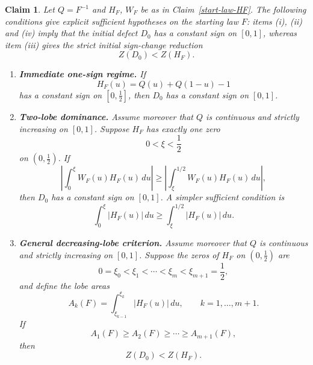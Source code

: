 \documentclass[onecolumn]{article}
\newtheorem{claim}[theorem]{Claim}
\begin{document}
\begin{claim}
\label{sufficient-conditions-summary} Let $Q=F^{-1}$ and $H_{F}$, $W_{F}$ be
as in \textit{Claim~\ref{start-law-HF}}. The following conditions give
explicit sufficient hypotheses on the starting law $F$: items \textup{(i)}, 
\textup{(ii)} and \textup{(iv)} imply that the initial defect $D_{0}$ has a
constant sign on $[0,1]$, whereas item \textup{(iii)} gives the strict
initial sign-change reduction 
\begin{equation}
Z(D_{0})<Z(H_{F}).  \label{1378.1}
\end{equation}

\begin{enumerate}
\item \textbf{Immediate one-sign regime.} If 
\begin{equation}
H_{F}(u)=Q(u)+Q(1-u)-1  \label{1379}
\end{equation}%
has a constant sign on $[0,\tfrac{1}{2}]$, then $D_{0}$ has a constant sign
on $[0,1]$.

\item \textbf{Two-lobe dominance.} Assume moreover that $Q$ is continuous
and strictly increasing on $[0,1]$. Suppose $H_{F}$ has exactly one zero 
\begin{equation}
0<\xi <\frac{1}{2}  \label{1380}
\end{equation}%
on $(0,\tfrac{1}{2})$. If 
\begin{equation}
\left\vert \int_{0}^{\xi }W_{F}(u)H_{F}(u)\,du\right\vert \geq \left\vert
\int_{\xi }^{1/2}W_{F}(u)H_{F}(u)\,du\right\vert ,  \label{1381}
\end{equation}%
then $D_{0}$ has a constant sign on $[0,1]$. A simpler sufficient condition
is 
\begin{equation}
\int_{0}^{\xi }|H_{F}(u)|\,du\geq \int_{\xi }^{1/2}|H_{F}(u)|\,du.
\label{1382}
\end{equation}

\item \textbf{General decreasing-lobe criterion.} Assume moreover that $Q$
is continuous and strictly increasing on $[0,1]$. Suppose the zeros of $%
H_{F} $ on $(0,\tfrac{1}{2})$ are 
\begin{equation}
0=\xi _{0}<\xi _{1}<\cdots <\xi _{m}<\xi _{m+1}=\frac{1}{2},  \label{1383}
\end{equation}%
and define the lobe areas 
\begin{equation}
A_{k}(F)=\int_{\xi _{k-1}}^{\xi _{k}}|H_{F}(u)|\,du,\qquad k=1,\dots ,m+1.
\label{1384}
\end{equation}%
If 
\begin{equation}
A_{1}(F)\geq A_{2}(F)\geq \cdots \geq A_{m+1}(F),  \label{1385}
\end{equation}%
then 
\begin{equation}
Z(D_{0})<Z(H_{F}).  \label{1386}
\end{equation}


\end{enumerate}
\end{claim}
\end{document}
